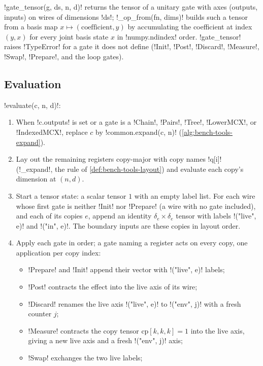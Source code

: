 \py!gate_tensor(g, ds, n, d)! returns the tensor of a unitary gate with axes (outputs, inputs) on wires of dimensions \py!ds!; \py!_op_from(fn, dims)! builds such a tensor from a basis map $x\mapsto(\text{coefficient},y)$ by accumulating the coefficient at index $(y,x)$ for every joint basis state $x$ in \py!numpy.ndindex! order. \py!gate_tensor! raises \py!TypeError! for a gate it does not define (\py!Init!, \py!Post!, \py!Discard!, \py!Measure!, \py!Swap!, \py!Prepare!, and the loop gates).

\subsection{Evaluation}

\begin{algorithm}\label{alg:bench-tools-dense-evaluate}
\py!evaluate(c, n, d)!:
\begin{enumerate}
\item When \py!c.outputs! is set or a gate is a \py!Chain!, \py!Pairs!, \py!Tree!, \py!LowerMCX!, or \py!IndexedMCX!, replace $c$ by \py!common.expand(c, n)! (\cref{alg:bench-tools-expand}).
\item Lay out the remaining registers copy-major with copy names \code!q[i]! (\py!_expand!, the rule of \cref{def:bench-tools-layout}) and evaluate each copy's dimension at $(n,d)$.
\item Start a tensor state: a scalar tensor $1$ with an empty label list. For each wire whose first gate is neither \py!Init! nor \py!Prepare! (a wire with no gate included), and each of its copies $e$, append an identity $\delta_e\times\delta_e$ tensor with labels \py!("live", e)! and \py!("in", e)!. The boundary inputs are these copies in layout order.
\item Apply each gate in order; a gate naming a register acts on every copy, one application per copy index:
  \begin{itemize}
  \item \py!Prepare! and \py!Init! append their vector with \py!("live", e)! labels;
  \item \py!Post! contracts the effect into the live axis of its wire;
  \item \py!Discard! renames the live axis \py!("live", e)! to \py!("env", j)! with a fresh counter $j$;
  \item \py!Measure! contracts the copy tensor $\mathrm{cp}[k,k,k]=1$ into the live axis, giving a new live axis and a fresh \py!("env", j)! axis;
  \item \py!Swap! exchanges the two live labels;

\end{itemize}
\end{enumerate}
\end{algorithm}
